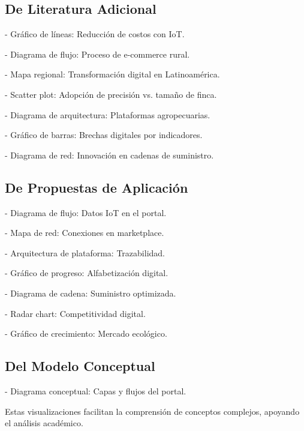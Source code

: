 \subsection{De Literatura Adicional}

- Gráfico de líneas: Reducción de costos con IoT.

- Diagrama de flujo: Proceso de e-commerce rural.

- Mapa regional: Transformación digital en Latinoamérica.

- Scatter plot: Adopción de precisión vs. tamaño de finca.

- Diagrama de arquitectura: Plataformas agropecuarias.

- Gráfico de barras: Brechas digitales por indicadores.

- Diagrama de red: Innovación en cadenas de suministro.

\subsection{De Propuestas de Aplicación}

- Diagrama de flujo: Datos IoT en el portal.

- Mapa de red: Conexiones en marketplace.

- Arquitectura de plataforma: Trazabilidad.

- Gráfico de progreso: Alfabetización digital.

- Diagrama de cadena: Suministro optimizada.

- Radar chart: Competitividad digital.

- Gráfico de crecimiento: Mercado ecológico.

\subsection{Del Modelo Conceptual}

- Diagrama conceptual: Capas y flujos del portal.

Estas visualizaciones facilitan la comprensión de conceptos complejos, apoyando el análisis académico.